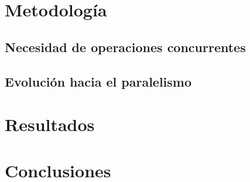 \documentclass[letterpaper,12pt,oneside]{book}
\begin{document}
\chapter{Metodología}  %
	\section{Necesidad de operaciones concurrentes}
	
	 \section{Evolución hacia el paralelismo}

\chapter{Resultados}  %


\chapter{Conclusiones}

%
%

\end{document}
